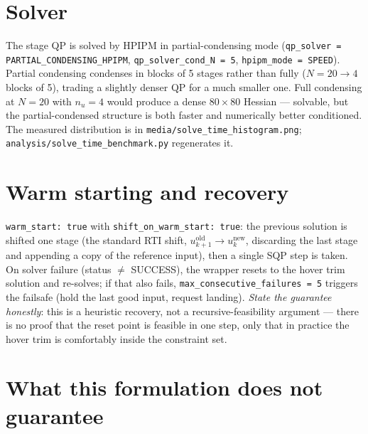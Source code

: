 \documentclass[11pt]{article}
\begin{document}
\section{Solver}

The stage QP is solved by HPIPM in partial-condensing mode
(\texttt{qp\_solver = PARTIAL\_CONDENSING\_HPIPM}, \texttt{qp\_solver\_cond\_N = 5},
\texttt{hpipm\_mode = SPEED}). Partial condensing condenses in blocks of 5 stages rather
than fully ($N = 20 \to 4$ blocks of 5), trading a slightly denser QP for a much smaller
one. Full condensing at $N = 20$ with $n_u = 4$ would produce a dense $80 \times 80$
Hessian — solvable, but the partial-condensed structure is both faster and numerically
better conditioned. The measured distribution is in
\texttt{media/solve\_time\_histogram.png}; \texttt{analysis/solve\_time\_benchmark.py}
regenerates it.

\section{Warm starting and recovery}
\label{sec:recovery}

\texttt{warm\_start: true} with \texttt{shift\_on\_warm\_start: true}: the previous
solution is shifted one stage (the standard RTI shift, $u_{k+1}^{\mathrm{old}} \to
u_k^{\mathrm{new}}$, discarding the last stage and appending a copy of the reference input),
then a single SQP step is taken. On solver failure (status $\neq$ SUCCESS), the wrapper
resets to the hover trim solution and re-solves; if that also fails,
\texttt{max\_consecutive\_failures = 5} triggers the failsafe (hold the last good input,
request landing). \emph{State the guarantee honestly}: this is a heuristic recovery, not a
recursive-feasibility argument — there is no proof that the reset point is feasible in one
step, only that in practice the hover trim is comfortably inside the constraint set.

\section{What this formulation does not guarantee}
\label{sec:limits}
\end{document}
